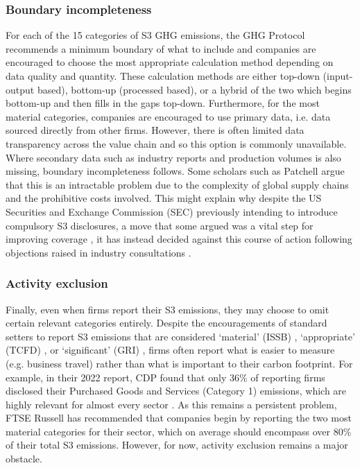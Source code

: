 \documentclass[12pt,twoside]{report}
\begin{document}
\subsubsection{Boundary incompleteness}

For each of the 15 categories of S3 GHG emissions, the GHG Protocol recommends a minimum boundary of what to include and companies are encouraged to choose the most appropriate calculation method depending on data quality and quantity. These calculation methods are either top-down (input-output based), bottom-up (processed based), or a hybrid of the two which begins bottom-up and then fills in the gaps top-down. Furthermore, for the most material categories, companies are encouraged to use primary data, i.e. data sourced directly from other firms. However, there is often limited data transparency across the value chain and so this option is commonly unavailable. Where secondary data such as industry reports and production volumes is also missing, boundary incompleteness follows. Some scholars such as Patchell \cite{patchell2018} argue that this is an intractable problem due to the complexity of global supply chains and the prohibitive costs involved. This might explain why despite the US Securities and Exchange Commission (SEC) previously intending to introduce compulsory S3 disclosures, a move that some argued was a vital step for improving coverage \cite{lgim2023}, it has instead decided against this course of action following objections raised in industry consultations \cite{sec2024}.

\subsubsection{Activity exclusion}

Finally, even when firms report their S3 emissions, they may choose to omit certain relevant categories entirely. Despite the encouragements of standard setters to report S3 emissions that are considered `material' (ISSB) \cite{ifrs2023}, `appropriate' (TCFD) \cite{tcfd2021}, or `significant' (GRI) \cite{gri2016},  firms often report what is easier to measure (e.g. business travel) rather than what is important to their carbon footprint. For example, in their 2022 report, CDP found that only 36\% of reporting firms disclosed their Purchased Goods and Services (Category 1) emissions, which are highly relevant for almost every sector \cite{cdp2022, ftserussell2024}. As this remains a persistent problem, FTSE Russell \cite{ftserussell2024} has recommended that companies begin by reporting the two most material categories for their sector, which on average should encompass over 80\% of their total S3 emissions. However, for now, activity exclusion remains a major obstacle.
\end{document}
